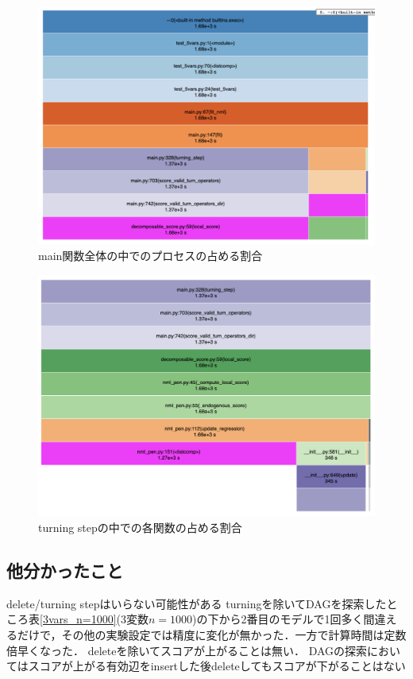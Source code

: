 \documentclass[dvipdfmx]{jsarticle}
\begin{document}
\begin{figure}[t]
 \begin{center}
  \includegraphics[width=0.8\linewidth,angle=0]{images/report1/report1_1.png}
  \caption{main関数全体の中でのプロセスの占める割合 \label{fig:bottleneck_1}}
 \end{center}
\end{figure}


\begin{figure}[t]
 \begin{center}
  \includegraphics[width=0.8\linewidth,angle=0]{images/report1/report1_2.png}
  \caption{turning stepの中での各関数の占める割合 \label{fig:bottleneck_2}}
 \end{center}
\end{figure}

\subsection{他分かったこと}
\begin{outline}
\1 delete/turning stepはいらない可能性がある
    \2 turningを除いてDAGを探索したところ表\ref{3vars_n=1000}(3変数$n=1000$)の下から2番目のモデルで1回多く間違えるだけで，その他の実験設定では精度に変化が無かった．一方で計算時間は定数倍早くなった．
\1 deleteを除いてスコアが上がることは無い．
    \2 DAGの探索においてはスコアが上がる有効辺をinsertした後deleteしてもスコアが下がることはない
  
\end{outline}




\end{document}
